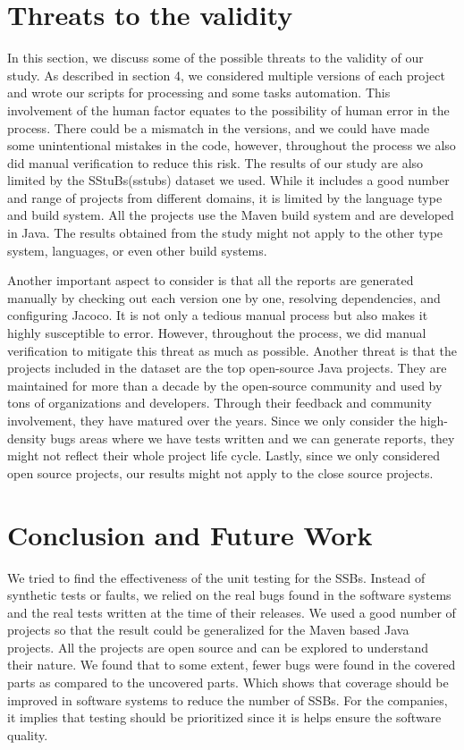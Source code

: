 \documentclass[sigconf,nonacm]{acmart}
\begin{document}
\section{Threats to the validity}
In this section, we discuss some of the possible threats to the validity of our study. As described in section 4, we considered multiple versions of each project and wrote our scripts for processing and some tasks automation. This involvement of the human factor equates to the possibility of human error in the process. There could be a mismatch in the versions, and we could have made some unintentional mistakes in the code, however, throughout the process we also did manual verification to reduce this risk. The results of our study are also limited by the SStuBs(sstubs) dataset we used. While it includes a good number and range of projects from different domains, it is limited by the language type and build system. All the projects use the Maven build system and are developed in Java. The results obtained from the study might not apply to the other type system, languages, or even other build systems.

Another important aspect to consider is that all the reports are generated manually by checking out each version one by one, resolving dependencies, and configuring Jacoco. It is not only a tedious manual process but also makes it highly susceptible to error. However, throughout the process, we did manual verification to mitigate this threat as much as possible. Another threat is that the projects included in the dataset are the top open-source Java projects. They are maintained for more than a decade by the open-source community and used by tons of organizations and developers. Through their feedback and community involvement, they have matured over the years. Since we only consider the high-density bugs areas where we have tests written and we can generate reports, they might not reflect their whole project life cycle. Lastly, since we only considered open source projects, our results might not apply to the close source projects.

\section{Conclusion and Future Work}

We tried to find the effectiveness of the unit testing for the SSBs. Instead of synthetic tests or faults, we relied on the real bugs found in the software systems and the real tests written at the time of their releases. We used a good number of projects so that the result could be generalized for the Maven based Java projects. All the projects are open source and can be explored to understand their nature. We found that to some extent, fewer bugs were found in the covered parts as compared to the uncovered parts. Which shows that coverage should be improved in software systems to reduce the number of SSBs. For the companies, it implies that testing should be prioritized since it is helps ensure the software quality.
\end{document}
